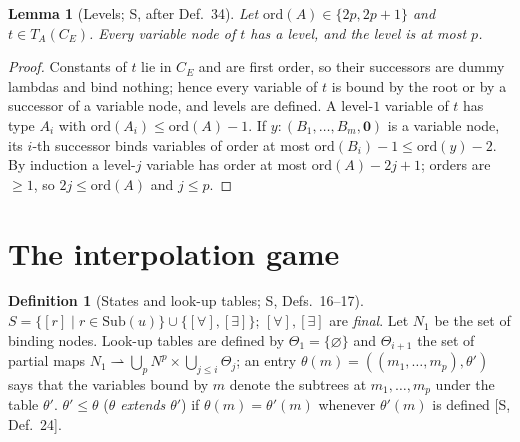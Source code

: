 \documentclass[11pt]{article}
\newcommand{\Ground}{\mathbf{0}}
\newcommand{\ord}{\mathrm{ord}}
\newcommand{\Sub}{\mathrm{Sub}}
\newcommand{\CE}{C_E}
\theoremstyle{plain}
\newtheorem{lemma}[theorem]{Lemma}
\theoremstyle{definition}
\newtheorem{definition}[theorem]{Definition}
\theoremstyle{remark}
\begin{document}
\begin{lemma}[Levels; S, after Def.~34]\label{lem:levels}
Let $\ord(A)\in\{2p,2p+1\}$ and $t\in T_A(\CE)$.  Every variable node of
$t$ has a level, and the level is at most $p$.
\end{lemma}
\begin{proof}
Constants of $t$ lie in $\CE$ and are first order, so their successors
are dummy lambdas and bind nothing; hence every variable of $t$ is bound
by the root or by a successor of a variable node, and levels are
defined.  A level-$1$ variable of $t$ has type $A_i$ with
$\ord(A_i)\le\ord(A)-1$.  If $y:(B_1,\dots,B_m,\Ground)$ is a variable
node, its $i$-th successor binds variables of order at most
$\ord(B_i)-1\le\ord(y)-2$.  By induction a level-$j$ variable has order
at most $\ord(A)-2j+1$; orders are $\ge1$, so $2j\le\ord(A)$ and
$j\le p$.
\end{proof}

\section{The interpolation game}

\begin{definition}[States and look-up tables; S, Defs.~16--17]
$S=\{[r]\mid r\in\Sub(u)\}\cup\{[\forall],[\exists]\}$; $[\forall],[\exists]$
are \emph{final}.  Let $N_1$ be the set of binding nodes.  Look-up
tables are defined by $\Theta_1=\{\varnothing\}$ and $\Theta_{i+1}$ the
set of partial maps
$N_1\rightharpoonup\bigcup_{p}N^p\times\bigcup_{j\le i}\Theta_j$; an
entry $\theta(m)=((m_1,\dots,m_p),\theta')$ says that the variables bound
by $m$ denote the subtrees at $m_1,\dots,m_p$ under the table $\theta'$.
$\theta'\le\theta$ (\emph{$\theta$ extends $\theta'$}) if $\theta(m)=
\theta'(m)$ whenever $\theta'(m)$ is defined [S, Def.~24].
\end{definition}
\end{document}
